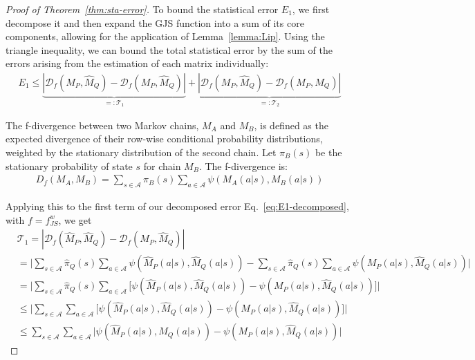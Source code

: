 \documentclass{article}
\theoremstyle{plain}
\theoremstyle{definition}
\theoremstyle{remark}
\begin{document}
 \begin{proof}[Proof of Theorem~\ref{thm:sta-error}]
     To bound the statistical error $E_1$, we first decompose it and then expand the GJS function into a sum of its core components, allowing for the application of Lemma~\ref{lemma:Lip}.
Using the triangle inequality, we can bound the total statistical error by the sum of the errors arising from the estimation of each matrix individually:
     \begin{align}
    E_1 \leq \underbrace{|\mathcal{D}_f(\hat M_P, \hat M_Q)-\mathcal{D}_f(M_P,\hat M_Q)| }_{=:\mathcal{T}_1}+ \underbrace{|\mathcal{D}_f( M_P, \hat M_Q)-\mathcal{D}_f(M_P,M_Q)| }_{=:\mathcal{T}_2}\label{eq:E1-decomposed}
\end{align}

The f-divergence between two Markov chains, $M_A$ and $M_B$, is defined as the expected divergence of their row-wise conditional probability distributions, weighted by the stationary distribution of the second chain. Let $\pi_B(s)$ be the stationary probability of state $s$ for chain $M_B$. The f-divergence is:
\begin{align}
    D_f(M_A,M_B) = \sum_{s\in \mathcal{A}} \pi_B(s) \sum_{a \in \mathcal{A}} \psi (M_A(a|s),M_B(a|s))
\end{align}

Applying this to the first term of our decomposed error Eq.~\eqref{eq:E1-decomposed}, with $f=f_{JS}^{w}$, we get
\begin{align}
    &\mathcal{T}_1=|\mathcal{D}_f(\hat M_P, \hat M_Q)-\mathcal{D}_f(M_P,\hat M_Q)| \\
    &= \bigg| \sum_{s\in \mathcal{A}} \hat \pi_Q(s) \sum_{a \in \mathcal{A}} \psi (\hat M_P(a|s),\hat M_Q(a|s)) - \sum_{s\in \mathcal{A}} \hat \pi_Q(s) \sum_{a \in \mathcal{A}} \psi ( M_P(a|s), \hat M_Q(a|s)) \bigg| \\
    &=  \bigg| \sum_{s\in \mathcal{A}} \hat \pi_Q(s) \sum_{a \in \mathcal{A}} \big[\psi (\hat M_P(a|s),\hat M_Q(a|s))-\psi ( M_P(a|s),\hat M_Q(a|s))\big]  \bigg| \\
    & \leq \bigg| \sum_{s\in \mathcal{A}} \sum_{a \in \mathcal{A}} \big[\psi (\hat M_P(a|s),\hat M_Q(a|s))-\psi ( M_P(a|s),\hat M_Q(a|s))\big]  \bigg| \\
    & \leq \sum_{s\in \mathcal{A}} \sum_{a \in \mathcal{A}}   \bigg|\psi (\hat M_P(a|s),\hat M_Q(a|s))-\psi ( M_P(a|s),\hat M_Q(a|s))  \bigg|
\end{align}

\end{proof}
\end{document}
